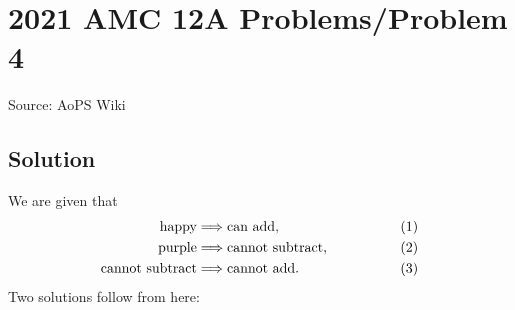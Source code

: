 \documentclass[12pt]{article}
\begin{document}
\section*{{2021 AMC 12A Problems/Problem 4}}
Source: AoPS Wiki

\subsection*{Solution}
We are given that \begin{align*} \text{happy}&\Longrightarrow\text{can add}, &(1) \\ \text{purple}&\Longrightarrow\text{cannot subtract}, \hspace{15mm} &(2) \\ \text{cannot subtract}&\Longrightarrow\text{cannot add}. &(3) \end{align*} Two solutions follow from here:
\end{document}
